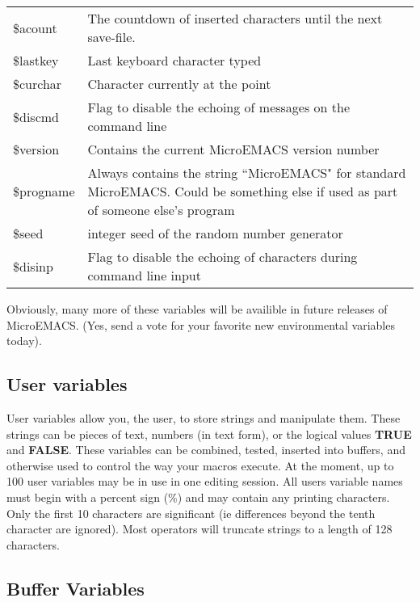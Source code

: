 \begin{tabular}{lp{5in}}
\$acount & The countdown of inserted characters until
the next save-file. \\

\$lastkey & Last keyboard character typed \\

\$curchar & Character currently at the point \\

\$discmd & Flag to disable the echoing of messages
on the command line \\

\$version & Contains the current MicroEMACS version number \\

\$progname & Always contains the string ``MicroEMACS" for
standard MicroEMACS. Could be something else
if used as part of someone else's program \\

\$seed & integer seed of the random number generator \\

\$disinp & Flag to disable the echoing of characters during command
line input \\

\end{tabular}

Obviously, many more of these variables will be availible in
future releases of MicroEMACS. (Yes, send a vote for your favorite new
environmental variables today).

\subsection{User variables}

User variables allow you, the user, to store strings and
manipulate them.  These strings can be pieces of text, numbers (in text
form), or the logical values {\bf{}TRUE} and {\bf{}FALSE}.  These variables
can be combined, tested, inserted into buffers, and otherwise used to
control the way your macros execute.  At the moment, up to 100 user
variables may be in use in one editing session.  All users variable
names must begin with a percent sign (\%) and may contain any printing
characters.  Only the first 10 characters are significant (ie
differences beyond the tenth character are ignored).  Most operators
will truncate strings to a length of 128 characters.

\subsection{Buffer Variables}

